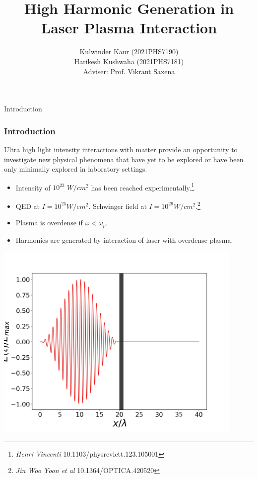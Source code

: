 \documentclass{beamer}
\title[High Harmonic Generation]{High Harmonic Generation in Laser Plasma Interaction}
\date{}
\institute[IITD]{\large Indian Institute of Technology, Delhi}
\author[]{Kulwinder Kaur (2021PHS7190)\\ Harikesh Kushwaha (2021PHS7181)\\[3mm]Adviser: Prof. Vikrant Saxena}
\begin{document}
\maketitle

\begin{frame}{Introduction}
    \frametitle{Introduction}
    \small
    Ultra high light intensity interactions with matter provide an opportunity to investigate new physical phenomena that have yet to be explored or have been only minimally explored in laboratory settings.
    \begin{itemize}
        \item Intensity of $10^{23} \; W/cm^{2}$ has been reached experimentally.\footnote{\textit{Henri Vincenti} 10.1103/physrevlett.123.105001}
        \item QED at $I = 10^{25}W/cm^{2}$. Schwinger field at $I = 10^{29}W/cm^{2}$.\footnote{\textit{Jin Woo Yoon et al} 10.1364/OPTICA.420520}
        \item Plasma is overdense if $\omega<\omega_p$.
        \item Harmonics are generated by interaction of laser with overdense plasma.
    \end{itemize}
    \begin{minipage}[h]{0.48\linewidth}
        \centering
        \includegraphics[width=0.9\textwidth, height=0.42\textheight]{images/field.jpg}
        \label{fig:field}
    \end{minipage}
    \begin{minipage}[h]{0.48\linewidth}
        \begin{figure}
            \centering

\end{figure}
\end{minipage}
\end{frame}
\end{document}
